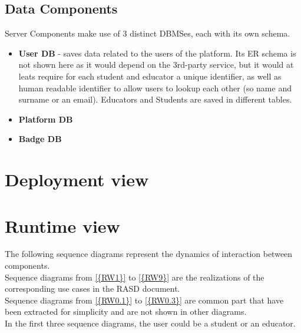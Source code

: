\subsection{Data Components}
Server Components make use of 3 distinct DBMSes, each with its own schema.
\begin{itemize}
    \item \textbf{User DB} {-} saves data related to the users of the platform. Its ER schema is not shown
          here as it would depend on the 3rd-party service, but it would at leats require for each student and
          educator a unique identifier, as well as human readable identifier to allow users to lookup each other
          (so name and surname or an email). Educators and Students are saved in different tables.
          \pagebreak
    \item \textbf{Platform DB}
          \begin{adjustbox}{
                  max size={\textwidth}{},
                  caption={Platform ER},
                  label={fig:Platform ER},
                  figure=H}
              \centering
          \end{adjustbox}
          \pagebreak
    \item \textbf{Badge DB}
          \begin{adjustbox}{
                  max size={\textwidth}{},
                  caption={Badges ER},
                  label={fig:Badges ER},
                  figure=H}
              \centering
          \end{adjustbox}
\end{itemize}
\pagebreak

\section{Deployment view}
\begin{adjustbox}{
        max size={\textwidth}{},
        caption={Deployment view diagram},
        label={fig:Deployment view diagram},
        figure=H}
    \centering
\end{adjustbox}
\pagebreak

\section{Runtime view}
The following sequence diagrams represent the dynamics of interaction between components.\\
Sequence diagrams from \ref{{RW1}} to \ref{{RW9}} are the realizations of the corresponding use cases in the RASD document.\\
Sequence diagrams from \ref{{RW0.1}} to \ref{{RW0.3}} are common part that have been extracted for simplicity and are not shown in other diagrams.\\
In the first three sequence diagrams, the user could be a student or an educator.

